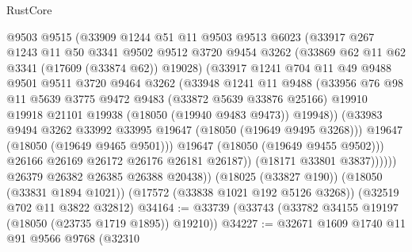 \begin{lexlean}{RustCore}
\begin{coremodule}
                    @9503
                    @9515
                    (@33909
                      @1244
                      @51
                      @11
                      @9503
                      @9513
                      @6023
                      (@33917
                        @267
                        @1243
                        @11
                        @50
                        @3341
                        @9502
                        @9512
                        @3720
                        @9454
                        @3262
                        (@33869 @62 @11 @62 @3341 (@17609 (@33874 @62)) @19028)
                        (@33917
                          @1241
                          @704
                          @11
                          @49
                          @9488
                          @9501
                          @9511
                          @3720
                          @9464
                          @3262
                          (@33948
                            @1241
                            @11
                            @9488
                            (@33956
                              @76
                              @98
                              @11
                              @5639
                              @3775
                              @9472
                              @9483
                              (@33872 @5639 @33876 @25166)
                              @19910
                              @19918
                              @21101
                              @19938
                              (@18050 (@19940 @9483 @9473))
                              @19948))
                          (@33983 @9494 @3262 @33992 @33995 @19647 (@18050 (@19649 @9495 @3268)))
                          @19647
                          (@18050 (@19649 @9465 @9501)))
                        @19647
                        (@18050 (@19649 @9455 @9502)))
                      @26166
                      @26169
                      @26172
                      @26176
                      @26181
                      @26187))
                  (@18171 @33801 @3837))))))
        @26379
        @26382
        @26385
        @26388
        @20438))
    (@18025 (@33827 @190))
    (@18050 (@33831 @1894 @1021))
    (@17572 (@33838 @1021 @192 @5126 @3268))
    (@32519 @702 @11 @3822 @32812)
@34164 := @33739 (@33743 (@33782 @34155 @19197 (@18050 (@23735 @1719 @1895)) @19210))
@34227 := @32671
    @1609
    @1740
    @11
    @91
    @9566
    @9768
    (@32310

\end{coremodule}
\end{lexlean}
